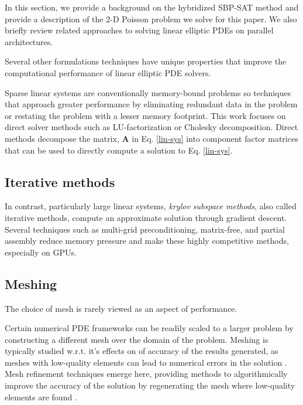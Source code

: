 %
%
%

%
% 
%
In this section, we provide a background on the hybridized SBP-SAT method and provide a description of the 2-D Poisson problem we solve for this paper. 
We also briefly review related approaches to solving linear elliptic PDEs on parallel architectures. 



Several other formulations techniques have unique properties that improve the computational performance of linear elliptic PDE solvers. 


Sparse linear systems are conventionally memory-bound problems so techniques that approach greater performance by eliminating redundant data in the problem or restating the problem with a lesser memory footprint. 
This work focuses on direct solver methods such as LU-factorization or Cholesky decomposition.
Direct methods decompose the matrix, $\mathbf{A}$ in Eq. \eqref{lin-sys} into component factor matrices that can be used to directly compute a solution to Eq. \eqref{lin-sys}.

\subsection{Iterative methods}
In contrast, particularly large linear systems, \emph{krylov subspace methods}, also called iterative methods, compute an approximate solution through gradient descent. 
Several techniques such as multi-grid preconditioning, matrix-free, and partial assembly reduce memory pressure and make these highly competitive methods, especially on GPUs.

\subsection*{Meshing}
The choice of mesh is rarely viewed as an aspect of performance. 

Certain numerical PDE frameworks can be readily scaled to a larger problem by constructing a different mesh over the domain of the problem. Meshing is typically studied w.r.t. it's effects on of accuracy of the results generated, as meshes with low-quality elements can lead to numerical errors in the solution \citep{sharma2021overset, dervieux2003theoretical}. Mesh refinement techniques emerge here, providing methods to algorithmically improve the accuracy of the solution by regenerating the mesh where low-quality elements are found \citep{berger1984adaptive, verfurth1994posteriori, geiersbach2020stochastic, bespalov2022error}. 


